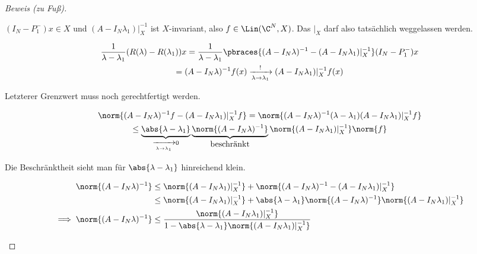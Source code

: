 \begin{proof}[Beweis (zu Fuß)]
\begin{enumerate}[label = (\roman*)]
        $(I_N - P_1^-) x \in X$ und $(A - I_N \lambda_1) |_X^{-1}$ ist $X$-invariant, also $f \in \Lin(\C^N, X)$.
        Das $|_X$ darf also tatsächlich weggelassen werden.

        \begin{multline*}
            \frac{1}{\lambda - \lambda_1}
            (R(\lambda) - R(\lambda_1)) x
            =
            \frac{1}{\lambda - \lambda_1}
            \pbraces
            {
                (A - I_N \lambda)^{-1}
                -
                (A - I_N \lambda_1) |_X^{-1}
            }
            (I_N - P_1^-)
            x \\
            =
            (A - I_N \lambda)^{-1} f(x)
            \xrightarrow[\lambda \to \lambda_1]{!}
            (A - I_N \lambda_1) |_X^{-1} f(x)
        \end{multline*}

        Letzterer Grenzwert muss noch gerechtfertigt werden.

        \begin{multline*}
            \norm
            {
                (A - I_N \lambda)^{-1} f
                -
                (A - I_N \lambda_1) |_X^{-1} f
            }
            =
            \norm
            {
                (A - I_N \lambda)^{-1}
                (\lambda - \lambda_1)
                (A - I_N \lambda_1) |_X^{-1}
                f
            } \\
            \leq
            \underbrace
            {
                \abs{\lambda - \lambda_1}
            }_{
                \xrightarrow[\lambda \to \lambda_1]{} 0
            }
            \underbrace
            {
                \norm{(A - I_N \lambda)^{-1}}
            }_{
                \displaystyle
                \text{beschränkt}
            }
            \norm{(A - I_N \lambda_1) |_X^{-1}}
            \norm{f}
        \end{multline*}

        Die Beschränktheit sieht man für $\abs{\lambda - \lambda_1}$ hinreichend klein.

        \begin{align*}
            \norm{(A - I_N \lambda)^{-1}}
            & \leq
            \norm{(A - I_N \lambda_1) |_X^{-1}}
            +
            \norm
            {
                (A - I_N \lambda)^{-1}
                -
                (A - I_N \lambda_1) |_X^{-1}
            } \\
            & \leq
            \norm{(A - I_N \lambda_1) |_X^{-1}}
            +
            \abs{\lambda - \lambda_1}
            \norm{(A - I_N \lambda)^{-1}}
            \norm{(A - I_N \lambda_1) |_X^{-1}} \\
            \implies
            \norm{(A - I_N \lambda)^{-1}}
            & \leq
            \frac
            {
                \norm{(A - I_N \lambda_1) |_X^{-1}}
            }{
                1
                -
                \abs{\lambda - \lambda_1}
                \norm{(A - I_N \lambda_1) |_X^{-1}}
            }
        \end{align*}


\end{enumerate}
\end{proof}
